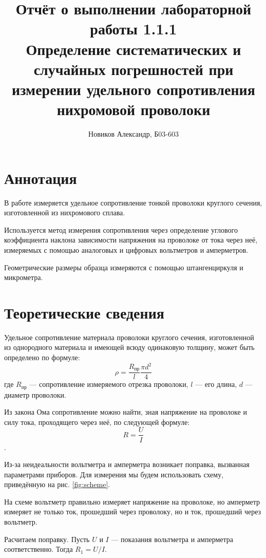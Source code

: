 \documentclass[a4paper, 12pt]{article}
\begin{document}
\title{Отчёт о выполнении лабораторной работы 1.1.1 \\
Определение систематических и случайных погрешностей при измерении удельного сопротивления нихромовой проволоки}
\author{Новиков Александр, Б03-603}
\maketitle

\section{Аннотация}
В работе измеряется удельное сопротивление тонкой проволоки круглого сечения,
изготовленной из нихромового сплава.

Используется метод измерения сопротивления через
определение углового коэффициента наклона зависимости напряжения на проволоке от тока
через неё, измеряемых с помощью аналоговых и цифровых вольтметров и амперметров.

Геометрические размеры образца измеряются с помощью штангенциркуля и микрометра. 

\section{Теоретические сведения}
Удельное сопротивление материала проволоки круглого сечения, изготовленной из однородного материала и имеющей всюду одинаковую толщину, может быть определено по формуле:
\begin{equation}
    \rho = \frac{R_\text{пр}}{l} \frac{\pi d^2}{4}
    \label{mainformula}
\end{equation}
где $R_\text{пр}$ --- сопротивление измеряемого отрезка проволоки, $l$ --- его длина, $d$ --- диаметр проволоки.

Из закона Ома сопротивление можно найти, зная напряжение на проволоке и силу
тока, проходящего через неё, по следующей формуле:
$$R=\frac{U}{I}$$.

Из-за неидеальности вольтметра и амперметра возникает поправка, вызванная
параметрами приборов. Для измерения мы будем использовать схему, приведённую
на рис. \ref{fig:scheme}.

На схеме вольтметр правильно измеряет напряжение на проволоке, но
амперметр измеряет не только ток, прошедший через проволоку, но и ток, прошедший
через вольтметр.

Расчитаем поправку. Пусть $U$ и $I$ --- показания вольтметра
и амперметра соответственно. Тогда $R_1=U/I$.
\end{document}

